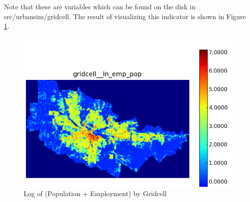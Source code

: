
Note that these are variables which can be found on the disk in
src/urbansim/gridcell.  The result of visualizing this indicator is
shown in Figure \ref{fig:indicator-ln-emp-pop}.

\begin{figure}[htp]
\begin{center}
\includegraphics[scale=0.4]{graphics/indicator-ln-emp-pop.png}
\end{center}
\caption{Log of (Population + Employment) by Gridcell}
\label{fig:indicator-ln-emp-pop}
\end{figure}

